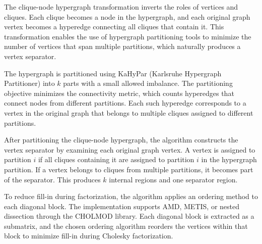 The clique-node hypergraph transformation inverts the roles of vertices and cliques. Each clique becomes a node in the hypergraph, and each original graph vertex becomes a hyperedge connecting all cliques that contain it. This transformation enables the use of hypergraph partitioning tools to minimize the number of vertices that span multiple partitions, which naturally produces a vertex separator.

The hypergraph is partitioned using KaHyPar (Karlsruhe Hypergraph Partitioner) into $k$ parts with a small allowed imbalance. The partitioning objective minimizes the connectivity metric, which counts hyperedges that connect nodes from different partitions. Each such hyperedge corresponds to a vertex in the original graph that belongs to multiple cliques assigned to different partitions.

After partitioning the clique-node hypergraph, the algorithm constructs the vertex separator by examining each original graph vertex. A vertex is assigned to partition $i$ if all cliques containing it are assigned to partition $i$ in the hypergraph partition. If a vertex belongs to cliques from multiple partitions, it becomes part of the separator. This produces $k$ internal regions and one separator region.

To reduce fill-in during factorization, the algorithm applies an ordering method to each diagonal block. The implementation supports AMD, METIS, or nested dissection through the CHOLMOD library. Each diagonal block is extracted as a submatrix, and the chosen ordering algorithm reorders the vertices within that block to minimize fill-in during Cholesky factorization.

